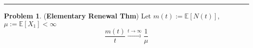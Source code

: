 \documentclass[a4paper, 10pt]{article}
\theoremstyle{definition}
\newtheorem{problem}{Problem}
\theoremstyle{hSol}
\begin{document}
\noindent\rule{16cm}{0.4pt}
\begin{problem} (\textbf{Elementary Renewal Thm}) Let $m(t):=\mathbb{E}\left[N(t)\right]$, $\mu:=\mathbb{E}\left[X_1\right]<\infty$
$$\frac{m(t)}{t} \xrightarrow{t\to \infty} \frac{1}{\mu}$$
\end{problem}
\end{document}
